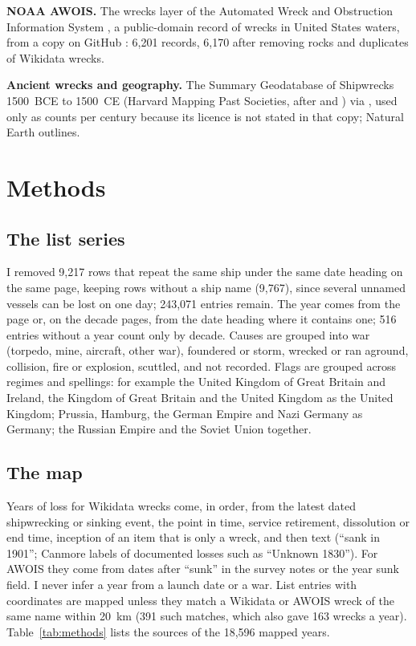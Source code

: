 \documentclass[11pt,a4paper]{article}
\begin{document}
\textbf{NOAA AWOIS.} The wrecks layer of the Automated Wreck and Obstruction Information System \citep{awois}, a public-domain record of wrecks in United States waters, from a copy on GitHub \citep{awoisgh}: 6,201 records, 6,170 after removing rocks and duplicates of Wikidata wrecks.

\textbf{Ancient wrecks and geography.} The Summary Geodatabase of Shipwrecks 1500~BCE to 1500~CE (Harvard Mapping Past Societies, after \citealt{strauss} and \citealt{parker}) via \citet{ancientgh}, used only as counts per century because its licence is not stated in that copy; Natural Earth \citep{naturalearth} outlines.

\section{Methods}
\subsection{The list series}
I removed 9,217 rows that repeat the same ship under the same date heading on the same page, keeping rows without a ship name (9,767), since several unnamed vessels can be lost on one day; 243,071 entries remain. The year comes from the page or, on the decade pages, from the date heading where it contains one; 516 entries without a year count only by decade. Causes are grouped into war (torpedo, mine, aircraft, other war), foundered or storm, wrecked or ran aground, collision, fire or explosion, scuttled, and not recorded. Flags are grouped across regimes and spellings: for example the United Kingdom of Great Britain and Ireland, the Kingdom of Great Britain and the United Kingdom as the United Kingdom; Prussia, Hamburg, the German Empire and Nazi Germany as Germany; the Russian Empire and the Soviet Union together.

\subsection{The map}
Years of loss for Wikidata wrecks come, in order, from the latest dated shipwrecking or sinking event, the point in time, service retirement, dissolution or end time, inception of an item that is only a wreck, and then text (``sank in 1901''; Canmore labels of documented losses such as ``Unknown 1830''). For AWOIS they come from dates after ``sunk'' in the survey notes or the year sunk field. I never infer a year from a launch date or a war. List entries with coordinates are mapped unless they match a Wikidata or AWOIS wreck of the same name within 20~km (391 such matches, which also gave 163 wrecks a year). Table~\ref{tab:methods} lists the sources of the 18,596 mapped years.
\end{document}
